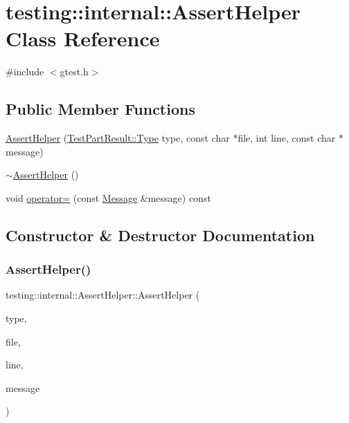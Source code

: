 \hypertarget{classtesting_1_1internal_1_1_assert_helper}{}\section{testing\+::internal\+::Assert\+Helper Class Reference}
\label{classtesting_1_1internal_1_1_assert_helper}


{\ttfamily \#include $<$gtest.\+h$>$}

\subsection*{Public Member Functions}
\begin{DoxyCompactItemize}
\item 
\mbox{\hyperlink{classtesting_1_1internal_1_1_assert_helper_ac2c9334518fd4087189b4505567a3c90}{Assert\+Helper}} (\mbox{\hyperlink{classtesting_1_1_test_part_result_a65ae656b33fdfdfffaf34858778a52d5}{Test\+Part\+Result\+::\+Type}} type, const char $\ast$file, int line, const char $\ast$message)
\item 
\mbox{\hyperlink{classtesting_1_1internal_1_1_assert_helper_a51c640785d4ed4a0155cc9aa857d8931}{$\sim$\+Assert\+Helper}} ()
\item 
void \mbox{\hyperlink{classtesting_1_1internal_1_1_assert_helper_a97bf22d786131ab7baa86b97a27aeb4d}{operator=}} (const \mbox{\hyperlink{classtesting_1_1_message}{Message}} \&message) const
\end{DoxyCompactItemize}


\subsection{Constructor \& Destructor Documentation}
\mbox{\label{classtesting_1_1internal_1_1_assert_helper_ac2c9334518fd4087189b4505567a3c90}} 
\subsubsection{\texorpdfstring{AssertHelper()}{AssertHelper()}}
{\footnotesize\ttfamily testing\+::internal\+::\+Assert\+Helper\+::\+Assert\+Helper (\begin{DoxyParamCaption}\item[{\mbox{\hyperlink{classtesting_1_1_test_part_result_a65ae656b33fdfdfffaf34858778a52d5}{Test\+Part\+Result\+::\+Type}}}]{type,  }\item[{const char $\ast$}]{file,  }\item[{int}]{line,  }\item[{const char $\ast$}]{message }\end{DoxyParamCaption})}

